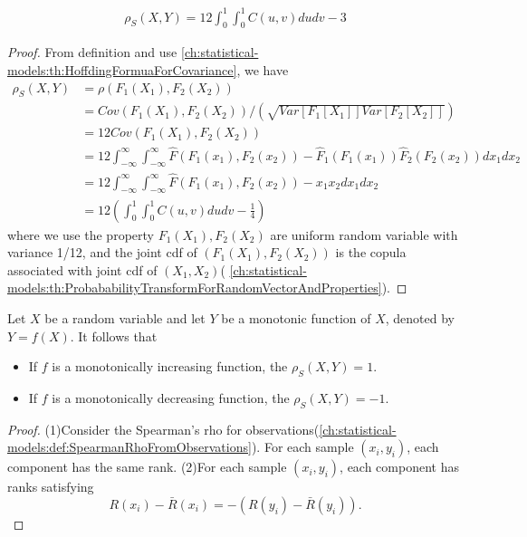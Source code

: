 \begin{refsection}
\begin{lemma}\cite[207]{mcneil2015quantitative}\label{ch:statistical-models:th:SpearmanRhoFromCopula}
\begin{align*}
\rho_{S}(X,Y) = 12\int_0^1\int_0^1 C(u,v)dudv - 3
\end{align*}	
\end{lemma}
\begin{proof}
From definition and use \autoref{ch:statistical-models:th:HoffdingFormuaForCovariance}, we have
\begin{align*}
\rho_{S}(X,Y)  &= \rho(F_1(X_1),F_2(X_2)) \\
& = Cov(F_1(X_1),F_2(X_2))/(\sqrt{Var[F_1[X_1]]Var[F_2[X_2]]}) \\
& = 12 Cov(F_1(X_1),F_2(X_2)) \\
& = 12 \int_{-\infty}^{\infty}\int_{-\infty}^{\infty} \hat{F}(F_1(x_1),F_2(x_2)) - \hat{F}_1(F_1(x_1))\hat{F}_2(F_2(x_2)) dx_1dx_2\\
& = 12 \int_{-\infty}^{\infty}\int_{-\infty}^{\infty} \hat{F}(F_1(x_1),F_2(x_2)) - x_1x_2 dx_1dx_2 \\
& = 12(\int_0^1\int_0^1 C(u,v)dudv - \frac{1}{4})
\end{align*}	
where we use the property $F_1(X_1),F_2(X_2)$ are uniform random variable with variance 1/12, and the joint cdf of $(F_1(X_1),F_2(X_2))$ is the copula associated with joint cdf of $(X_1,X_2)$( 
\autoref{ch:statistical-models:th:ProbababilityTransformForRandomVectorAndProperties}).
\end{proof}


\begin{lemma}
Let $X$ be a random variable and let $Y$ be a monotonic function of $X$, denoted by $Y = f(X)$. It follows that
\begin{itemize}
	\item If $f$ is a monotonically increasing function, the $\rho_S(X,Y) = 1.$
	\item If $f$ is a monotonically decreasing function, the $\rho_S(X,Y) = -1.$
\end{itemize}	
\end{lemma}
\begin{proof}
(1)Consider the Spearman's rho for observations(\autoref{ch:statistical-models:def:SpearmanRhoFromObservations}). For each sample $(x_i,y_i)$, each component has the same rank.	
(2)For each sample $(x_i,y_i)$, each component has ranks satisfying
$$R(x_i) - \bar{R}(x_i) = -(R(y_i) - \bar{R}(y_i)).$$	


\end{proof}
\end{refsection}
